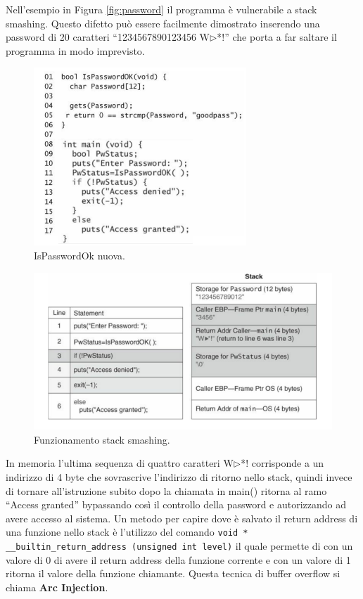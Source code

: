 Nell'esempio in Figura \ref{fig:password} il programma è vulnerabile a stack smashing.
Questo difetto può essere facilmente dimostrato inserendo una password di 20 caratteri
“1234567890123456 W$\triangleright$*!” che porta a far saltare il programma in modo
imprevisto.

\begin{figure}[H]
    \centering
    \includegraphics[width=8cm, keepaspectratio]{capitoli/secure_coding/img/cap_2/pass_ok_new.png}
    \caption{IsPasswordOk nuova.}\label{fig:pass_ok_new}
\end{figure}

\begin{figure}[H]
    \centering
    \includegraphics[width=13cm, keepaspectratio]{capitoli/secure_coding/img/cap_2/es_pass_ok_new.png}
    \caption{Funzionamento stack smashing.}\label{fig:es_pass_ok_new}
\end{figure}

In memoria l'ultima sequenza di quattro caratteri W$\triangleright$*! corrisponde a
un indirizzo di 4 byte che sovrascrive l'indirizzo di ritorno nello stack, quindi
invece di tornare all'istruzione subito dopo la chiamata in main() ritorna al ramo
“Access granted” bypassando così il controllo della password e autorizzando ad avere
accesso al sistema.
Un metodo per capire dove è salvato il return address di una funzione nello stack è
l'utilizzo del comando
\verb|void * __builtin_return_address (unsigned int level)| il quale permette di con
un valore di 0 di avere il return address della funzione corrente e con un valore di
1 ritorna il valore della funzione chiamante. Questa tecnica di buffer overflow si
chiama \textbf{Arc Injection}.


